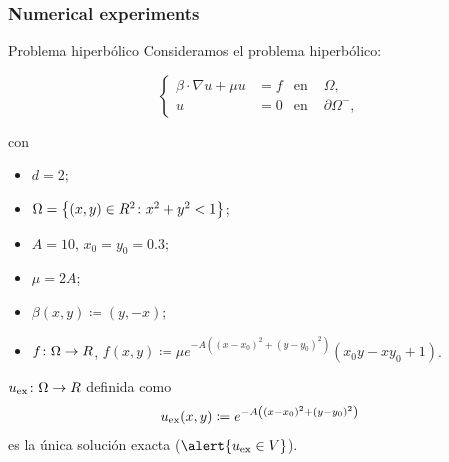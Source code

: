 	\subsubsection{Numerical experiments}
	\begin{frame}{Problema hiperbólico}
		Consideramos el problema hiperbólico:
		\begin{block}{}
		\begin{equation*}
		\left\{
		\begin{aligned}
		\beta\cdot\nabla u+\mu u&=f & \text{en } &\Omega, \\
		u&=0 & \text{en } &\partial\Omega^-,
		\end{aligned}
		\right.
		\end{equation*}
		\end{block}
		con
		\begin{itemize}
			\item $d=2$;
			\item $\Omega=\left\{(x,y)\in\relax R^2\colon x^2+y^2<1 \right\}$;
			\item $A=10$, $x_0=y_0=0.3$;
			\item $\mu=2A$;
			\item $\beta(x,y)\coloneqq(y,-x)$;
			\item $f\colon\Omega\to\relax R$, $f(x,y)\coloneqq \mu e^{-A\left((x-x_0)^2+(y-y_0)^2\right)}(x_0 y -x y_0 + 1)$.
		\end{itemize}
		
		\vspace*{0.3cm}
		$u_{\text{ex}}\colon\Omega\to\relax R$ definida como
		\begin{equation*}
		\label{sol_experimento_hiperbolico}
		u_{\text{ex}} (x,y)\coloneqq e^{-A\left((x-x_0)^2+(y-y_0)^2\right)}
		\end{equation*}
		es la \alert{única solución exacta} ($\alert{u_\text{ex}\in V}$).
		
		\end{frame}
		
